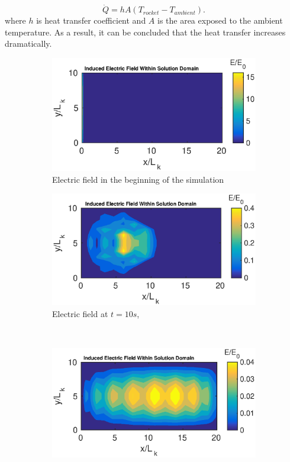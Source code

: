 \documentclass[12pt]{report}
\begin{document}
\begin{equation}
\label{eq:31}
\dot{Q}=hA(T_{rocket}-T_{ambient}).
\end{equation}
where $h$ is heat transfer coefficient and $A$ is the area exposed to the ambient temperature. As a result, it can be concluded that the heat transfer increases dramatically.
\begin{figure}[h!]
\label{fig:uvel}
    \centering
    \begin{subfigure}[b]{0.5\textwidth}
        \centering
        \includegraphics[width=1.\textwidth]{Ebeg.eps}
        \caption{Electric field in the beginning of the simulation}
    \end{subfigure}%
    \begin{subfigure}[b]{0.5\textwidth}
        \centering
        \includegraphics[width=1.\textwidth]{Emid1.eps}
        \caption{Electric field at $t=10s$,}
    \end{subfigure}
    \\
     \begin{subfigure}[b]{0.5\textwidth}
        \centering
        \includegraphics[width=1.\textwidth]{Emid2.eps}

\end{subfigure}
\end{figure}
\end{document}
